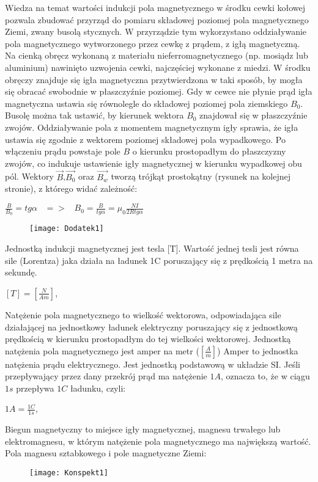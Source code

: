 \documentclass[12pt]{article}
\begin{document}
Wiedza na temat wartości indukcji pola magnetycznego w środku cewki kołowej pozwala zbudować przyrząd do pomiaru składowej poziomej pola magnetycznego Ziemi, zwany busolą stycznych. W przyrządzie tym wykorzystano oddziaływanie pola magnetycznego wytworzonego przez cewkę z prądem, z igłą magnetyczną. Na cienką obręcz wykonaną z materiału nieferromagnetycznego
(np. mosiądz lub aluminium) nawinięto uzwojenia cewki, najczęściej wykonane z miedzi. W środku obręczy znajduje się igła magnetyczna przytwierdzona w taki sposób, by mogła się obracać swobodnie w płaszczyźnie poziomej. Gdy w cewce nie płynie prąd igła magnetyczna ustawia się równolegle do składowej poziomej pola ziemskiego $B_0$. Busolę można tak ustawić, by kierunek wektora $B_0$ znajdował się w płaszczyźnie zwojów. Oddziaływanie pola z momentem magnetycznym igły sprawia, że igła ustawia się zgodnie z wektorem poziomej składowej pola wypadkowego. Po włączeniu prądu powstaje pole $B$ o kierunku prostopadłym do płaszczyzny zwojów, co indukuje ustawienie igły magnetycznej w kierunku wypadkowej obu pól. Wektory $\vec{B}$,$\vec{B_0}$ oraz
$\vec{B_w}$ tworzą trójkąt prostokątny (rysunek na kolejnej stronie), z którego widać zależność:
\begin{center}
\Large $\frac{B}{B_0}=tg\alpha \;\;\; => \;\;\; B_0=\frac{B}{tg\alpha}=\mu_0\frac{NI}{2Rtg\alpha}$
\end{center}
\begin{figure}[H]
\centering
\texttt{[image: Dodatek1]}
\end{figure} 
Jednostką indukcji magnetycznej jest tesla [T]. Wartość jednej tesli jest równa sile (Lorentza) jaka działa na ładunek 1C poruszający się z prędkością 1 metra na sekundę.
\begin{center}
\Large $ [T] = [\frac{N}{Am}]$,
\end{center}
Natężenie pola magnetycznego to wielkość wektorowa, odpowiadająca sile działającej na jednostkowy ładunek elektryczny poruszający się z jednostkową prędkością w kierunku prostopadłym do tej wielkości wektorowej. Jednostką natężenia pola magnetycznego jest amper na metr ($[\frac{A}{m}]$) \newline
Amper to jednostka natężenia prądu elektrycznego. Jest jednostką podstawową w układzie SI. Jeśli przepływający przez dany przekrój prąd ma natężenie $1A$, oznacza to, że w ciągu $1s$ przepływa $1C$ ładunku, czyli: 
\begin{center}
\Large $ 1A = \frac{1C}{1s}$,
\end{center}
Biegun magnetyczny to miejsce igły magnetycznej, magnesu trwałego lub elektromagnesu, w którym natężenie pola magnetycznego ma największą wartość. Pola magnesu sztabkowego i pole magnetyczne Ziemi:
\begin{figure}[H]
\centering
\texttt{[image: Konspekt1]}
\end{figure} 
\end{document}
